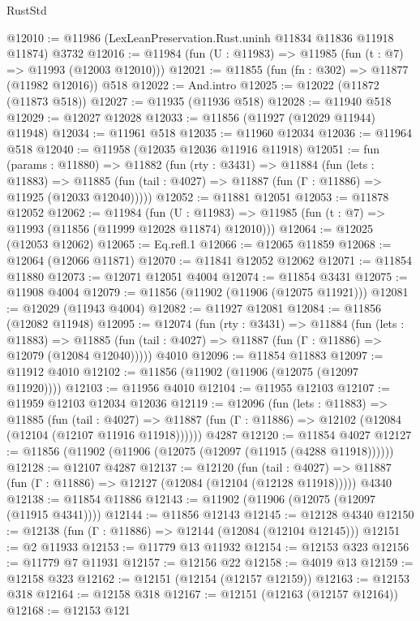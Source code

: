 \begin{lexlean}{RustStd}
\begin{coremodule}
@12010 := @11986 (LexLeanPreservation.Rust.uninh @11834 @11836 @11918 @11874) @3732
@12016 := @11984 (fun (U : @11983) => @11985 (fun (t : @7) => @11993 (@12003 @12010)))
@12021 := @11855 (fun (fn : @302) => @11877 (@11982 @12016)) @518
@12022 := And.intro
@12025 := @12022 (@11872 (@11873 @518))
@12027 := @11935 (@11936 @518)
@12028 := @11940 @518
@12029 := @12027 @12028
@12033 := @11856 (@11927 (@12029 @11944) @11948)
@12034 := @11961 @518
@12035 := @11960 @12034
@12036 := @11964 @518
@12040 := @11958 (@12035 @12036 @11916 @11918)
@12051 := fun (params : @11880) =>
  @11882
    (fun (rty : @3431) =>
    @11884
      (fun (lets : @11883) =>
      @11885 (fun (tail : @4027) => @11887 (fun (Γ : @11886) => @11925 (@12033 @12040)))))
@12052 := @11881 @12051
@12053 := @11878 @12052
@12062 := @11984
    (fun (U : @11983) => @11985 (fun (t : @7) => @11993 (@11856 (@11999 @12028 @11874) @12010)))
@12064 := @12025 (@12053 @12062)
@12065 := Eq.refl.{1}
@12066 := @12065 @11859
@12068 := @12064 (@12066 @11871)
@12070 := @11841 @12052 @12062
@12071 := @11854 @11880
@12073 := @12071 @12051 @4004
@12074 := @11854 @3431
@12075 := @11908 @4004
@12079 := @11856 (@11902 (@11906 (@12075 @11921)))
@12081 := @12029 (@11943 @4004)
@12082 := @11927 @12081
@12084 := @11856 (@12082 @11948)
@12095 := @12074
    (fun (rty : @3431) =>
    @11884
      (fun (lets : @11883) =>
      @11885 (fun (tail : @4027) => @11887 (fun (Γ : @11886) => @12079 (@12084 @12040)))))
    @4010
@12096 := @11854 @11883
@12097 := @11912 @4010
@12102 := @11856 (@11902 (@11906 (@12075 (@12097 @11920))))
@12103 := @11956 @4010
@12104 := @11955 @12103
@12107 := @11959 @12103 @12034 @12036
@12119 := @12096
    (fun (lets : @11883) =>
    @11885
      (fun (tail : @4027) =>
      @11887 (fun (Γ : @11886) => @12102 (@12084 (@12104 (@12107 @11916 @11918))))))
    @4287
@12120 := @11854 @4027
@12127 := @11856 (@11902 (@11906 (@12075 (@12097 (@11915 (@4288 @11918))))))
@12128 := @12107 @4287
@12137 := @12120
    (fun (tail : @4027) => @11887 (fun (Γ : @11886) => @12127 (@12084 (@12104 (@12128 @11918)))))
    @4340
@12138 := @11854 @11886
@12143 := @11902 (@11906 (@12075 (@12097 (@11915 @4341))))
@12144 := @11856 @12143
@12145 := @12128 @4340
@12150 := @12138 (fun (Γ : @11886) => @12144 (@12084 (@12104 @12145)))
@12151 := @2 @11933
@12153 := @11779 @13 @11932
@12154 := @12153 @323
@12156 := @11779 @7 @11931
@12157 := @12156 @22
@12158 := @4019 @13
@12159 := @12158 @323
@12162 := @12151 (@12154 (@12157 @12159))
@12163 := @12153 @318
@12164 := @12158 @318
@12167 := @12151 (@12163 (@12157 @12164))
@12168 := @12153 @121

\end{coremodule}
\end{lexlean}
